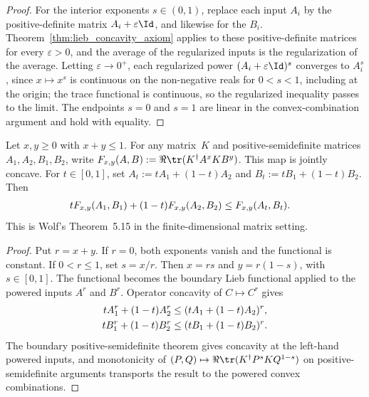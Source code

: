 \begin{proof}\leanok
    For the interior exponents $s\in(0,1)$, replace each input $A_i$ by the
    positive-definite matrix $A_i+\varepsilon\Id$, and likewise for the $B_i$.
    Theorem~\ref{thm:lieb_concavity_axiom} applies to these positive-definite
    matrices for every $\varepsilon>0$, and the average of the regularized
    inputs is the regularization of the average. Letting $\varepsilon\to0^+$,
    each regularized power $(A_i+\varepsilon\Id)^s$ converges to $A_i^s$, since
    $x\mapsto x^s$ is continuous on the non-negative reals for $0<s<1$, including
    at the origin; the trace functional is continuous, so the regularized
    inequality passes to the limit. The endpoints $s=0$ and $s=1$ are linear in
    the convex-combination argument and hold with equality.
\end{proof}

\begin{theorem}
    \label{thm:lieb_concavity_subboundary}
    \leanok
    Let $x,y\ge0$ with $x+y\le1$. For any matrix~$K$ and
    positive-semidefinite matrices $A_1,A_2,B_1,B_2$, write
    $F_{x,y}(A,B):=\Re\tr(K^\dagger A^x K B^y)$. This map is jointly concave.
    For $t\in[0,1]$, set $A_t:=tA_1+(1-t)A_2$ and
    $B_t:=tB_1+(1-t)B_2$. Then
    \begin{align}
        tF_{x,y}(A_1,B_1)+(1-t)F_{x,y}(A_2,B_2)
        &\le F_{x,y}(A_t,B_t).
        \notag
    \end{align}
    This is Wolf's Theorem~5.15 in the finite-dimensional matrix setting.
\end{theorem}

\begin{proof}\leanok
    Put $r=x+y$. If $r=0$, both exponents vanish and the functional is constant.
    If $0<r\le1$, set $s=x/r$. Then $x=rs$ and $y=r(1-s)$, with
    $s\in[0,1]$. The functional becomes the boundary Lieb functional applied to
    the powered inputs $A^r$ and $B^r$. Operator concavity of
    $C\mapsto C^r$ gives
    \begin{align}
        tA_1^r+(1-t)A_2^r
        &\le (tA_1+(1-t)A_2)^r,
        \notag\\
        tB_1^r+(1-t)B_2^r
        &\le (tB_1+(1-t)B_2)^r.
        \notag
    \end{align}
    The boundary positive-semidefinite theorem gives concavity at the left-hand
    powered inputs, and monotonicity of
    $(P,Q)\mapsto\Re\tr(K^\dagger P^s K Q^{1-s})$ on positive-semidefinite
    arguments transports the result to the powered convex combinations.
\end{proof}

